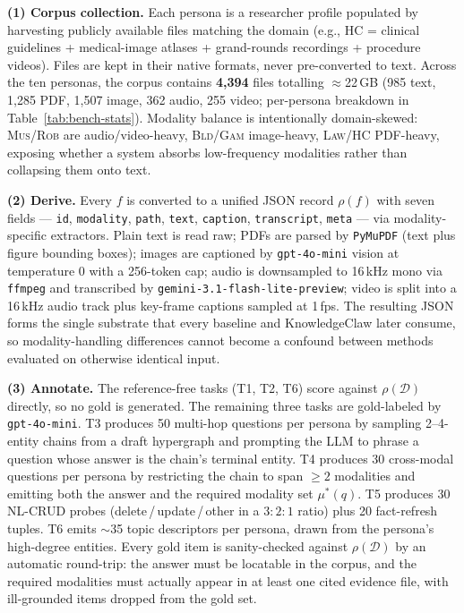 \documentclass{article}
\begin{document}
\noindent\textbf{(1) Corpus collection.} Each persona is a researcher profile populated by harvesting publicly available files matching the domain (e.g., \textsc{HC} = clinical guidelines + medical-image atlases + grand-rounds recordings + procedure videos). Files are kept in their native formats, never pre-converted to text. Across the ten personas, the corpus contains \textbf{4{,}394} files totalling $\approx$22\,GB (985 text, 1{,}285 PDF, 1{,}507 image, 362 audio, 255 video; per-persona breakdown in Table~\ref{tab:bench-stats}). Modality balance is intentionally domain-skewed: \textsc{Mus}/\textsc{Rob} are audio/video-heavy, \textsc{Bld}/\textsc{Gam} image-heavy, \textsc{Law}/\textsc{HC} PDF-heavy, exposing whether a system absorbs low-frequency modalities rather than collapsing them onto text.

\noindent\textbf{(2) Derive.} Every $f$ is converted to a unified JSON record $\rho(f)$ with seven fields ---  \texttt{id}, \texttt{modality}, \texttt{path}, \texttt{text}, \texttt{caption}, \texttt{transcript}, \texttt{meta} --- via modality-specific extractors. Plain text is read raw; PDFs are parsed by \texttt{PyMuPDF} (text plus figure bounding boxes); images are captioned by \texttt{gpt-4o-mini} vision at temperature $0$ with a 256-token cap; audio is downsampled to 16\,kHz mono via \texttt{ffmpeg} and transcribed by \texttt{gemini-3.1-flash-lite-preview}; video is split into a 16\,kHz audio track plus key-frame captions sampled at 1\,fps. The resulting JSON forms the single substrate that every baseline and KnowledgeClaw later consume, so modality-handling differences cannot become a confound between methods evaluated on otherwise identical input.

\noindent\textbf{(3) Annotate.} The reference-free tasks (T1, T2, T6) score against $\rho(\mathcal{D})$ directly, so no gold is generated. The remaining three tasks are gold-labeled by \texttt{gpt-4o-mini}. T3 produces 50 multi-hop questions per persona by sampling 2--4-entity chains from a draft hypergraph and prompting the LLM to phrase a question whose answer is the chain's terminal entity. T4 produces 30 cross-modal questions per persona by restricting the chain to span $\geq\!2$ modalities and emitting both the answer and the required modality set $\mu^{*}(q)$. T5 produces 30 NL-CRUD probes (delete\,/\,update\,/\,other in a $3\!:\!2\!:\!1$ ratio) plus 20 fact-refresh tuples. T6 emits $\sim$35 topic descriptors per persona, drawn from the persona's high-degree entities. Every gold item is sanity-checked against $\rho(\mathcal{D})$ by an automatic round-trip: the answer must be locatable in the corpus, and the required modalities must actually appear in at least one cited evidence file, with ill-grounded items dropped from the gold set.
\end{document}

